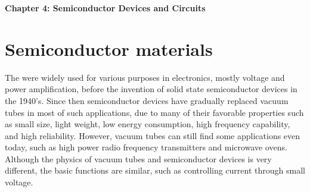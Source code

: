 \usepackage{html}


{\bf Chapter 4: Semiconductor Devices and Circuits}

\section*{Semiconductor materials}

The  were widely used for various purposes in electronics, mostly voltage 
and power amplification, before the invention of solid state semiconductor 
devices in the 1940's. Since then semiconductor devices have gradually replaced
vacuum tubes in most of such applications, due to many of their favorable 
properties such as small size, light weight, low energy consumption, high 
frequency capability, and high reliability. However, vacuum tubes can still 
find some applications even today, such as high power radio frequency transmitters
and microwave ovens. Although the physics of vacuum tubes and semiconductor 
devices is very different, the basic functions are similar, such as controlling
current through small voltage.


